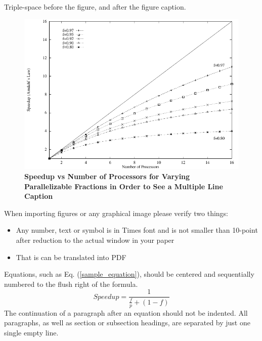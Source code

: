 \documentclass{ansconf}
\begin{document}
Triple-space before the figure, and after the figure caption.

%
\vspace{16pt}
\begin{figure}[!htb]
\begin{spacing}{1.0}
\centering
\includegraphics[scale=0.60]{figure}
\caption{\bf Speedup vs Number of Processors for Varying Parallelizable 
Fractions in Order to See a Multiple Line Caption} 
\label{fig:amdahl}
\end{spacing}
\end{figure}
\vspace{16pt}
%

When importing figures or any graphical image please verify two things:
\begin{itemize}
\item Any number, text or symbol is in Times font and is not smaller than 
    10-point after reduction to the actual window in your paper
\item That is can be translated into PDF
\end{itemize}


Equations, such as Eq. (\ref{sample_equation}), should be centered and 
sequentially numbered to the flush right of the formula.
\begin{equation}
  \label{sample_equation}
  Speedup = \frac{1}{\frac{f}{p} + (1-f)}
\end{equation}
The continuation of a paragraph after an equation should not be indented.  
All paragraphs, as well as section or subsection headings, are separated by 
just one single empty line.


\end{document}
